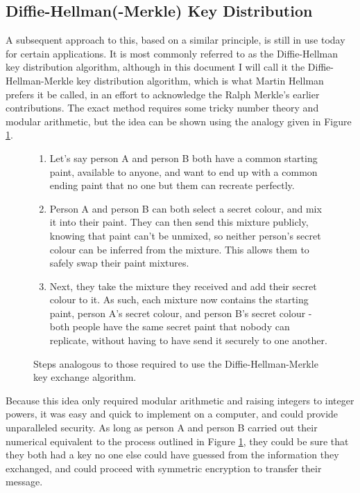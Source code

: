 \documentclass[a4paper,12pt]{report}
\begin{document}
    \subsection{Diffie-Hellman(-Merkle) Key Distribution}
A subsequent approach to this, based on a similar principle, is still in use
today for certain applications. It is most commonly referred to as the
Diffie-Hellman key distribution algorithm, although in this document I will call
it the Diffie-Hellman-Merkle key distribution algorithm, which is what Martin
Hellman prefers it be called, in an effort to acknowledge the Ralph Merkle's
earlier contributions\cite{hellman}. The exact method requires some tricky
number theory and modular arithmetic\cite{diffiehellman}, but the idea can be
shown using the analogy given in Figure \ref{fig:diffiehellman}.
    \begin{figure}[h!]
      \begin{enumerate}
\item Let's say person A and person B both have a common starting paint,
available to anyone, and want to end up with a common ending paint that no one
but them can recreate perfectly.
\item Person A and person B can both select a secret colour, and mix it into
their paint. They can then send this mixture publicly, knowing that paint can't
be unmixed, so neither person's secret colour can be inferred from the mixture.
This allows them to safely swap their paint mixtures.
\item Next, they take the mixture they received and add their secret colour to
it. As such, each mixture now contains the starting paint, person A's secret
colour, and person B's secret colour - both people have the same secret paint
that nobody can replicate, without having to have send it securely to one
another.
      \end{enumerate}
      \caption{Steps analogous to those required to use the
Diffie-Hellman-Merkle key exchange algorithm.}
      \label{fig:diffiehellman}
    \end{figure}
Because this idea only required modular arithmetic and raising integers to
integer powers, it was easy and quick to implement on a computer, and could
provide unparalleled security. As long as person A and person B carried out
their numerical equivalent to the process outlined in Figure
\ref{fig:diffiehellman}, they could be sure that they both had a key no one else
could have guessed from the information they exchanged, and could proceed with
symmetric encryption to transfer their message.
\end{document}
